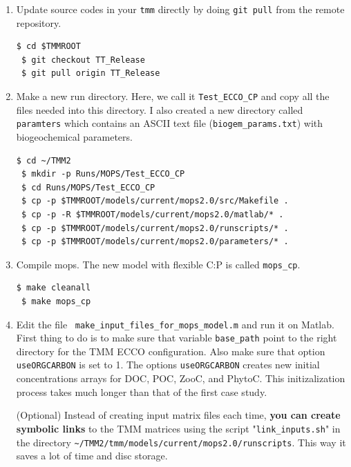\documentclass[a4paper]{article}
\def\noin{\noindent }
\begin{document}
\begin{enumerate}
\item{Update source codes in your \verb|tmm| directly by doing \verb|git pull| from the remote repository.}
\begin{lstlisting}[style=DOS]
 $ cd $TMMROOT
 $ git checkout TT_Release
 $ git pull origin TT_Release
\end{lstlisting}

\item Make a new run directory. Here, we call it \verb|Test_ECCO_CP| and copy all the files needed into this directory. I also created a new directory called \verb|paramters| which contains an ASCII text file (\verb|biogem_params.txt|) with biogeochemical parameters.
\begin{lstlisting}[style=DOS]
 $ cd ~/TMM2
 $ mkdir -p Runs/MOPS/Test_ECCO_CP
 $ cd Runs/MOPS/Test_ECCO_CP
 $ cp -p $TMMROOT/models/current/mops2.0/src/Makefile .
 $ cp -p -R $TMMROOT/models/current/mops2.0/matlab/* .
 $ cp -p $TMMROOT/models/current/mops2.0/runscripts/* .
 $ cp -p $TMMROOT/models/current/mops2.0/parameters/* .
\end{lstlisting}

\item Compile mops. The new model with flexible C:P is called \verb|mops_cp|. 
\begin{lstlisting}[style=DOS]
 $ make cleanall
 $ make mops_cp
\end{lstlisting}

\item Edit the file \ \verb/make_input_files_for_mops_model.m/ and run it on Matlab. First thing to do is to make sure that variable \verb/base_path/ point to the right directory for the TMM ECCO configuration. Also make sure that option \verb|useORGCARBON| is set to 1. The options \verb|useORGCARBON| creates new initial concentrations arrays for DOC, POC, ZooC, and PhytoC. This initizalization process takes much longer than that of the first case study.

\noin (Optional) Instead of creating input matrix files each time, \textbf{you can create symbolic links} to the TMM matrices using the script "\verb|link_inputs.sh|" in the directory \verb|~/TMM2/tmm/models/current/mops2.0/runscripts|. This way it saves a lot of time and disc storage.


\end{enumerate}
\end{document}
